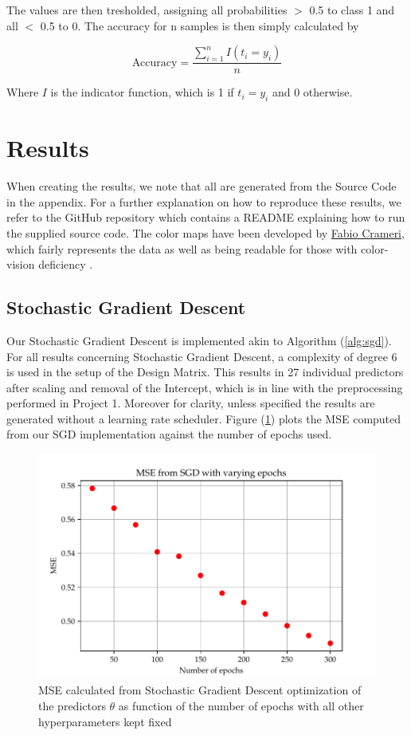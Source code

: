 \documentclass
[twocolumn,
secnumarabic,
nobibnotes,
aps,
prl,
reprint,
groupedaddress,
amsmath,
amssymb
]{revtex4-2}
\begin{document}
The values are then tresholded, assigning all probabilities $>$ 0.5 to class 1 and all $<$ 0.5 to 0. The accuracy for n samples is then simply calculated by

\begin{equation}
  \label{eq:acc}
  \text{Accuracy} = \frac{\sum_{i=1}^n I(t_i = y_i)}{n}
\end{equation}

Where $I$ is the indicator function, which is 1 if $t_i = y_i$ and 0 otherwise.

\section{Results}
When creating the results, we note that all are generated from the Source Code in the appendix. For a further explanation on how to reproduce these results, we refer to the GitHub repository which contains a README explaining how to run the supplied source code. The color maps have been developed by \href{https://www.fabiocrameri.ch/colourmaps/}{Fabio Crameri}, which fairly represents the data as well as being readable for those with color-vision deficiency \cite{Crameri2021}.

\subsection{Stochastic Gradient Descent}
Our Stochastic Gradient Descent is implemented akin to Algorithm (\ref{alg:sgd}). For all results concerning Stochastic Gradient Descent, a complexity of degree 6 is used in the setup of the Design Matrix. This results in 27 individual predictors after scaling and removal of the Intercept, which is in line with the preprocessing performed in Project 1. Moreover for clarity, unless specified the results are generated without a learning rate scheduler.
Figure (\ref{fig:a_mse_epoch}) plots the MSE computed from our SGD implementation against the number of epochs used.

\begin{figure}
  \includegraphics[width=\columnwidth]{figures/EX_A_mse_with_varying_epoch.pdf}
  \caption{\label{fig:a_mse_epoch}MSE calculated from Stochastic Gradient Descent optimization of the predictors $\theta$ as function of the number of epochs with all other hyperparameters kept fixed}
\end{figure}
\end{document}
